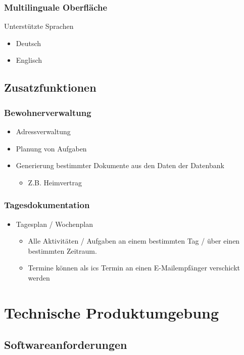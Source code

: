 \documentclass[a4paper,10pt]{article}
\begin{document}
\subsubsection{Multilinguale Oberfläche}
Unterstützte Sprachen
\begin{itemize}
 \item Deutsch
 \item Englisch
\end{itemize}
\subsection{Zusatzfunktionen}
\subsubsection{Bewohnerverwaltung}
\begin{itemize}
	\item Adressverwaltung
	\item Planung von Aufgaben
	\item Generierung bestimmter Dokumente aus den Daten der Datenbank
	\begin{itemize}
		\item Z.B. Heimvertrag
	\end{itemize}
\end{itemize}
\subsubsection{Tagesdokumentation}
\begin{itemize}
	\item Tagesplan / Wochenplan
	\begin{itemize}
		\item Alle Aktivitäten / Aufgaben an einem bestimmten Tag / über einen bestimmten Zeitraum.
		\item Termine können als ics Termin an einen E-Mailempfänger verschickt werden
	\end{itemize}
\end{itemize}


\section{Technische Produktumgebung}
\subsection{Softwareanforderungen}
\end{document}
